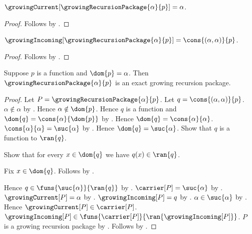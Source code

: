 \begin{proposition}\label{growing_recursion_package_current_value}
    $\growingCurrent[\growingRecursionPackage{\alpha}{p}]=\alpha$.
\end{proposition}
\begin{proof}
    Follows by .
\end{proof}

\begin{proposition}\label{growing_recursion_package_incoming_value}
    $\growingIncoming[\growingRecursionPackage{\alpha}{p}]
        =\cons{(\alpha,\alpha)}{p}$.
\end{proposition}
\begin{proof}
    Follows by .
\end{proof}

\begin{theorem}\label{growing_recursion_package_is_exact}
    Suppose $p$ is a function and $\dom{p}=\alpha$.
    Then $\growingRecursionPackage{\alpha}{p}$ is an exact
        growing recursion package.
\end{theorem}
\begin{proof}
    Let $P=\growingRecursionPackage{\alpha}{p}$.
    Let $q=\cons{(\alpha,\alpha)}{p}$.
    $\alpha\notin\alpha$ by .
    Hence $\alpha\notin\dom{p}$.
    Hence $q$ is a function and
        $\dom{q}=\cons{\alpha}{\dom{p}}$ by
        .
    Hence $\dom{q}=\cons{\alpha}{\alpha}$.
    $\cons{\alpha}{\alpha}=\suc{\alpha}$ by .
    Hence $\dom{q}=\suc{\alpha}$.
    Show that $q$ is a function to $\ran{q}$.
    \begin{subproof}
        Show that for every $x\in\dom{q}$ we have $q(x)\in\ran{q}$.
        \begin{subproof}
            Fix $x\in\dom{q}$.
            Follows by .
        \end{subproof}
    \end{subproof}
    Hence $q\in\funs{\suc{\alpha}}{\ran{q}}$ by
        .
    $\carrier[P]=\suc{\alpha}$ by
        .
    $\growingCurrent[P]=\alpha$ by
        .
    $\growingIncoming[P]=q$ by
        .
    $\alpha\in\suc{\alpha}$ by .
    Hence $\growingCurrent[P]\in\carrier[P]$.
    $\growingIncoming[P]\in
        \funs{\carrier[P]}{\ran{\growingIncoming[P]}}$.
    $P$ is a growing recursion package by
        .
    Follows by .
\end{proof}

